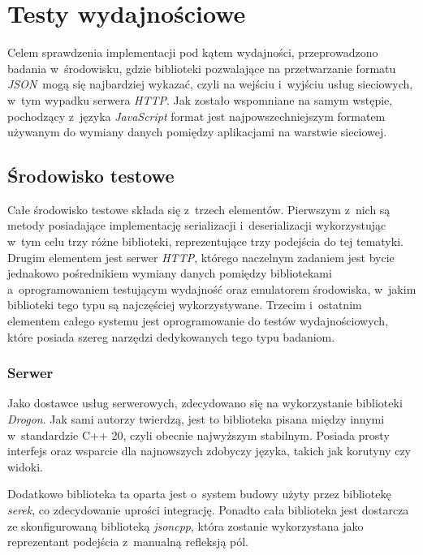 \documentclass[12pt]{article}
\newcommand{\n}{\newline}
\newcommand{\nonpl}[1]{{\it #1}}
\newcommand{\JSON}{\nonpl{JSON}}
\newcommand{\HTTP}{\nonpl{HTTP}}
\newcommand{\serek}{\nonpl{serek}}
\begin{document}
	{
		\section{Testy wydajnościowe}

		Celem sprawdzenia implementacji pod kątem wydajności, przeprowadzono badania w~środowisku, gdzie biblioteki pozwalające na przetwarzanie
		formatu \JSON~mogą się najbardziej wykazać, czyli na wejściu i~wyjściu usług sieciowych, w~tym wypadku serwera \HTTP. Jak zostało wspomniane
		na samym wstępie, pochodzący z~języka \nonpl{JavaScript} format jest najpowszechniejszym formatem \cite{google_trends_json_api_vs_rest_of_the_world}
		używanym do wymiany danych pomiędzy aplikacjami na warstwie sieciowej.

		{
			\subsection{Środowisko testowe}

			Całe środowisko testowe składa się z~trzech elementów. Pierwszym z~nich są metody posiadające implementację serializacji i~deserializacji
			wykorzystując w~tym celu trzy różne biblioteki, reprezentujące trzy podejścia do tej tematyki. Drugim elementem jest serwer \HTTP, którego
			naczelnym zadaniem jest bycie jednakowo pośrednikiem wymiany danych pomiędzy bibliotekami a~oprogramowaniem testującym wydajność oraz
			emulatorem środowiska, w~jakim biblioteki tego typu są najczęściej wykorzystywane. Trzecim i~ostatnim elementem całego systemu jest
			oprogramowanie do testów wydajnościowych, które posiada szereg narzędzi dedykowanych tego typu badaniom.

			{
				\subsubsection{Serwer}

				Jako dostawce usług serwerowych, zdecydowano się na wykorzystanie biblioteki \nonpl{Drogon}\cite{drogon}. Jak sami autorzy twierdzą,
				jest to biblioteka pisana między innymi w~standardzie C++ 20, czyli obecnie najwyższym stabilnym. Posiada prosty interfejs oraz
				wsparcie dla najnowszych zdobyczy języka, takich jak korutyny czy widoki.\n

				Dodatkowo biblioteka ta oparta jest o~system budowy użyty przez bibliotekę \serek, co zdecydowanie uprości integrację. Ponadto
				cała biblioteka jest dostarcza ze skonfigurowaną biblioteką \nonpl{jsoncpp}\cite{jsoncpp_repo}, która zostanie wykorzystana jako
				reprezentant podejścia z~manualną refleksją pól.\n

}}}
\end{document}

